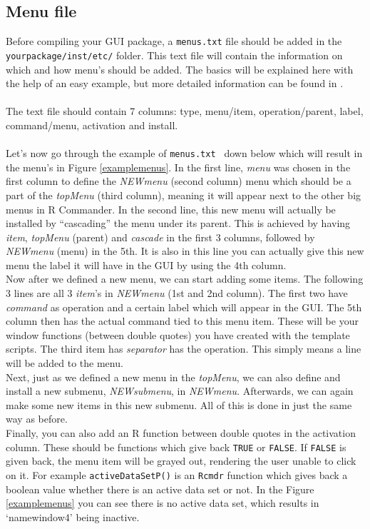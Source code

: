 \documentclass[a4paper]{article}\usepackage[]{graphicx}\usepackage[]{color}
\begin{document}
\subsection{Menu file}
\noindent Before compiling your GUI package, a \texttt{menus.txt} file should be
added in the \texttt{yourpackage/inst/etc/} folder. This text file will contain
the information on which and how menu's should be added. The basics will be
explained here with the help of an easy example, but more detailed information
can be found in \citet{Fox2007}.
\\ \\
The text file should contain 7 columns: type, menu/item, operation/parent,
label, command/menu, activation and install.
\\ \\
Let's now go through the example of \verb|menus.txt	| down below which will
result in the menu's in Figure \ref{examplemenus}. In the first line, {\it menu}
was chosen in the first column to define the {\it NEWmenu} (second column) menu
which should be a part of the {\it topMenu} (third column), meaning it will
appear next to the other big menus in R Commander. In the second line, this new
menu will actually be installed by ``cascading'' the menu under its parent. This
is achieved by having {\it item}, {\it topMenu} (parent) and {\it cascade} in the first
3 columns, followed by {\it NEWmenu} (menu) in the 5th. It is also in this line
you can actually give this new menu the label it will have in the GUI by using
the 4th column. \\
Now after we defined a new menu, we can start adding some items. The following 3
lines are all 3 {\it item}'s in {\it NEWmenu} (1st and 2nd column). The first
two have {\it command} as operation and a certain label which will appear in the
GUI. The 5th column then has the actual command tied to this menu item. These
will be your window functions (between double quotes) you have created with the template scripts. The
third item has {\it separator} has the operation. This simply means a line will
be added to the menu.\\
Next, just as we defined a new menu in the {\it topMenu}, we can also define and
install a new submenu, {\it NEWsubmenu}, in {\it NEWmenu}. Afterwards, we can again make some
new items in this new submenu. All of this is done in just the same way as
before.\\
Finally, you can also add an R function between double quotes in the activation
column. These should be functions which give back \verb|TRUE| or \verb|FALSE|.
If \verb|FALSE| is given back, the menu item will be grayed out, rendering the
user unable to click on it. For example \verb|activeDataSetP()| is an
\verb|Rcmdr| function which gives back a boolean value whether there is an
active data set or not. In the Figure \ref{examplemenus} you can see there is no
active data set, which results in `namewindow4' being inactive.
\end{document}
